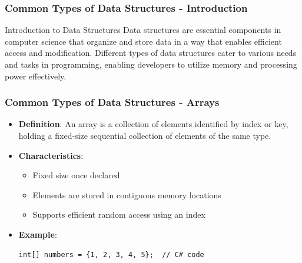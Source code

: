 \documentclass{beamer}
\begin{document}
\begin{frame}[fragile]
    \frametitle{Common Types of Data Structures - Introduction}
    \begin{block}{Introduction to Data Structures}
        Data structures are essential components in computer science that organize and store data in a way that enables efficient access and modification. Different types of data structures cater to various needs and tasks in programming, enabling developers to utilize memory and processing power effectively.
    \end{block}
\end{frame}

\begin{frame}[fragile]
    \frametitle{Common Types of Data Structures - Arrays}
    \begin{itemize}
        \item \textbf{Definition}: An array is a collection of elements identified by index or key, holding a fixed-size sequential collection of elements of the same type.
        \item \textbf{Characteristics}: 
        \begin{itemize}
            \item Fixed size once declared
            \item Elements are stored in contiguous memory locations
            \item Supports efficient random access using an index
        \end{itemize}
        \item \textbf{Example}: 
        \begin{lstlisting}
int[] numbers = {1, 2, 3, 4, 5};  // C# code
        \end{lstlisting}
    \end{itemize}
\end{frame}
\end{document}
